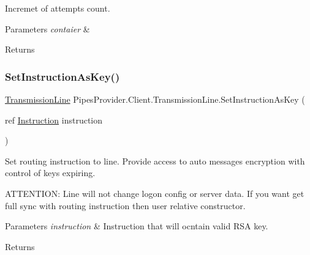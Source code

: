 Incremet of attempts count. 


\begin{DoxyParams}{Parameters}
{\em contaier} & \\
\hline
\end{DoxyParams}
\begin{DoxyReturn}{Returns}

\end{DoxyReturn}
\mbox{\label{class_pipes_provider_1_1_client_1_1_transmission_line_a2741ab56f9eecbe0bcbd018232321205}} 
\subsubsection{\texorpdfstring{Set\+Instruction\+As\+Key()}{SetInstructionAsKey()}}
{\footnotesize\ttfamily \mbox{\hyperlink{class_pipes_provider_1_1_client_1_1_transmission_line}{Transmission\+Line}} Pipes\+Provider.\+Client.\+Transmission\+Line.\+Set\+Instruction\+As\+Key (\begin{DoxyParamCaption}\item[{ref \mbox{\hyperlink{class_pipes_provider_1_1_networking_1_1_routing_1_1_instruction}{Instruction}}}]{instruction }\end{DoxyParamCaption})}



Set routing instruction to line. Provide access to auto messages encryption with control of keys expiring. 

A\+T\+T\+E\+N\+T\+I\+ON\+: Line will not change logon config or server data. If you want get full sync with routing instruction then user relative constructor. 


\begin{DoxyParams}{Parameters}
{\em instruction} & Instruction that will ocntain valid R\+SA key.\\
\hline
\end{DoxyParams}
\begin{DoxyReturn}{Returns}

\end{DoxyReturn}
\mbox{\label{class_pipes_provider_1_1_client_1_1_transmission_line_aebf1f90d880307f803bdeb6e0020a95f}} 
